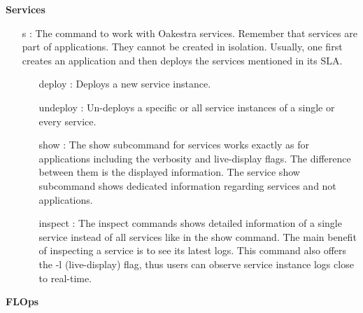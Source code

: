 \vspace{5mm}
\textbf{Services}
\begin{itemize}
    \item [s]:
        The command to work with Oakestra services.
        Remember that services are part of applications.
        They cannot be created in isolation.
        Usually, one first creates an application and then deploys the services mentioned in its SLA.
        \begin{itemize}
            \item [deploy]:
                Deploys a new service instance.
            \item [undeploy]:
                Un-deploys a specific or all service instances of a single or every service.
            \item [show]:
                The show subcommand for services works exactly as for applications including the verbosity and live-display flags.
                The difference between them is the displayed information.
                The service show subcommand shows dedicated information regarding services and not applications.
            \item [inspect]:
                The inspect commands shows detailed information of a single service instead of all services like in the show command.
                The main benefit of inspecting a service is to see its latest logs.
                This command also offers the -l (live-display) flag, thus users can observe service instance logs close to real-time.
        \end{itemize}
\end{itemize}
\vspace{5mm}
\textbf{FLOps}
